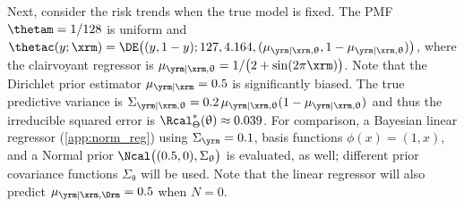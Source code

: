 \documentclass[12pt]{report}
\begin{document}
Next, consider the risk trends when the true model is fixed. The PMF $\thetam = 1/128$ is uniform and $\thetac(y;\xrm) = \DE\big((y, 1-y); 127, 4.164, (\mu_{\yrm | \xrm,\uptheta}, 1-\mu_{\yrm | \xrm,\uptheta})\big)$, where the clairvoyant regressor is $\mu_{\yrm | \xrm,\uptheta} = 1 / \big(2 + \sin(2\pi \xrm)\big)$. Note that the Dirichlet prior estimator $\mu_{\yrm | \xrm} = 0.5$ is significantly biased. The true predictive variance is $\Sigma_{\yrm | \xrm, \uptheta} = 0.2 \, \mu_{\yrm | \xrm, \uptheta} (1 - \mu_{\yrm | \xrm, \uptheta})$ and thus the irreducible squared error is $\Rcal_{\Theta}^*(\uptheta) \approx 0.039$. For comparison, a Bayesian linear regressor (\cref{app:norm_reg}) using $\Sigma_{\yrm}=0.1$, basis functions $\phi(x) = (1, x)$, and a Normal prior $\Ncal\big((0.5, 0), \Sigma_{\uptheta}\big)$ is evaluated, as well; different prior covariance functions $\Sigma_{\uptheta}$ will be used. Note that the linear regressor will also predict $\mu_{\yrm | \xrm, \Drm} = 0.5$ when $N=0$.
\end{document}
